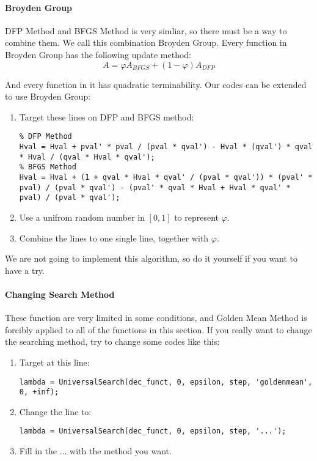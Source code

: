 \documentclass{article}
\begin{document}
\paragraph{Broyden Group}
DFP Method and BFGS Method is very simliar, so there must be a way to combine them. We call this combination Broyden Group. Every function in Broyden Group has the following update method:
\begin{equation*}
    A = \varphi A_{BFGS} + (1 - \varphi) A_{DFP}
\end{equation*}

And every function in it has quadratic terminability. Our codes can be extended to use Broyden Group:
\begin{enumerate}
    \item Target these lines on DFP and BFGS method:
    \begin{verbatim}
% DFP Method
Hval = Hval + pval' * pval / (pval * qval') - Hval * (qval') * qval * Hval / (qval * Hval * qval');
% BFGS Method
Hval = Hval + (1 + qval * Hval * qval' / (pval * qval')) * (pval' * pval) / (pval * qval') - (pval' * qval * Hval + Hval * qval' * pval) / (pval * qval');
    \end{verbatim}
    \item Use a unifrom random number in $[0, 1]$ to represent $\varphi$.
    \item Combine the lines to one single line, together with $\varphi$.
\end{enumerate}

We are not going to implement this algorithm, so do it yourself if you want to have a try.

\paragraph{Changing Search Method}
These function are very limited in some conditions, and Golden Mean Method is forcibly applied to all of the functions in this section. If you really want to change the searching method, try to change some codes like this:
\begin{enumerate}
    \item Target at this line:
    \begin{verbatim}
lambda = UniversalSearch(dec_funct, 0, epsilon, step, 'goldenmean', 0, +inf);
    \end{verbatim}
    \item Change the line to:
    \begin{verbatim}
lambda = UniversalSearch(dec_funct, 0, epsilon, step, '...');
    \end{verbatim}
    \item Fill in the $\dots$ with the method you want. 
\end{enumerate}
\end{document}
